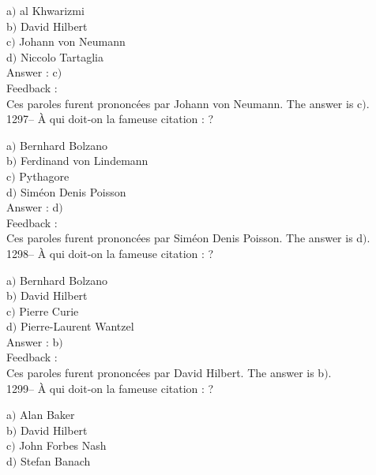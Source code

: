 \documentclass[letterpaper, 12pt]{article}
\begin{document}
a$)$ al Khwarizmi \\
b$)$ David Hilbert \\
c$)$ Johann von Neumann \\
d$)$ Niccolo Tartaglia\\

Answer : c$)$\\

Feedback : \\
Ces paroles furent prononc\'ees par Johann von Neumann.
The answer is  c$)$.\\

1297-- \`A qui doit-on la fameuse citation : \fg ?

a$)$ Bernhard Bolzano \\
b$)$ Ferdinand von Lindemann \\
c$)$ Pythagore \\
d$)$ Sim\'eon Denis Poisson\\

Answer : d$)$\\

Feedback : \\
Ces paroles furent prononc\'ees par Sim\'eon Denis Poisson.
The answer is  d$)$.\\

1298-- \`A qui doit-on la fameuse citation : \fg ?

a$)$ Bernhard Bolzano \\
b$)$ David Hilbert \\
c$)$ Pierre Curie \\
d$)$ Pierre-Laurent Wantzel\\

Answer : b$)$\\

Feedback : \\
Ces paroles furent prononc\'ees par David Hilbert.
The answer is  b$)$.\\

1299-- \`A qui doit-on la fameuse citation : \fg?

a$)$ Alan Baker \\
b$)$ David Hilbert \\
c$)$ John Forbes Nash \\
d$)$ Stefan Banach\\
\end{document}

